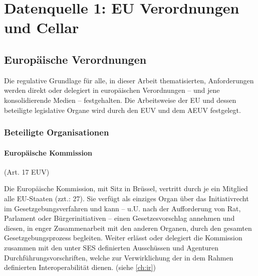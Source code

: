 \chapter{Datenquelle 1: EU Verordnungen und Cellar}


    \section{Europäische Verordnungen}


Die regulative Grundlage für alle, in dieser Arbeit thematisierten, Anforderungen werden direkt oder delegiert in europäischen Verordnungen -- und jene konsolidierende Medien -- festgehalten.
Die Arbeitsweise der EU und dessen beteiligte legislative Organe wird durch den \acf{EUV} und dem \acf{AEUV} festgelegt.
        
        \subsection{Beteiligte Organisationen}

\subsubsection{Europäische Kommission}

\begin{center}
    {\footnotesize(Art. 17 \ac{EUV})}
\end{center}

\noindent
Die Europäische Kommission, mit Sitz in Brüssel, vertritt durch je ein Mitglied alle EU-Staaten (zzt.: 27). 
Sie verfügt als einziges Organ über das Initiativrecht im Gesetzgebungsverfahren und kann – u.U. nach der Aufforderung von Rat, Parlament oder Bürgerinitiativen – einen Gesetzesvorschlag annehmen und diesen, in enger Zusammenarbeit mit den anderen Organen, durch den gesamten Gesetzgebungsprozess begleiten.
\cite[Art. 17]{EUV}
Weiter erlässt oder delegiert die Kommission zusammen mit den unter \ac{SES} definierten Ausschüssen und Agenturen Durchführungsvorschriften, welche zur Verwirklichung der in dem Rahmen definierten Interoperabilität dienen. (siehe \ref{ch:ir})

